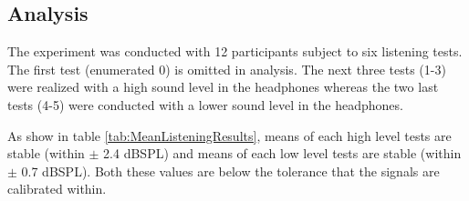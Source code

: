 \subsection{Analysis}

The experiment was conducted with 12 participants subject to six listening tests. The first test (enumerated 0) is omitted in analysis. The next three tests (1-3) were realized with a high sound level in the headphones whereas the two last tests (4-5) were conducted with a lower sound level in the headphones. 


As show in table \ref{tab:MeanListeningResults}, means of each high level tests are stable (within $\pm$ 2.4 dBSPL) and means of each low level tests are stable (within $\pm$ 0.7 dBSPL). Both these values are below the tolerance that the signals are calibrated within. 

